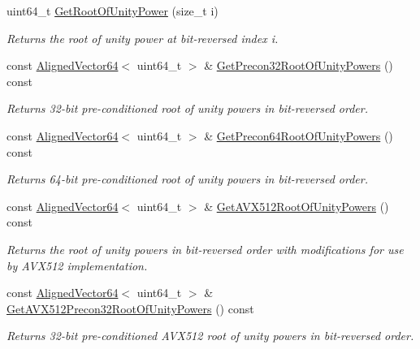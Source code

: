 \begin{DoxyCompactItemize}
uint64\+\_\+t \hyperlink{classintel_1_1hexl_1_1NTT_af0ab14a87e3f9e8cf46502c4c766fec5}{Get\+Root\+Of\+Unity\+Power} (size\+\_\+t i)
\begin{DoxyCompactList}\small\item\em Returns the root of unity power at bit-\/reversed index i. \end{DoxyCompactList}\item 
const \hyperlink{namespaceintel_1_1hexl_afbdf0d2cc4209ee547a88ff22a02801b}{Aligned\+Vector64}$<$ uint64\+\_\+t $>$ \& \hyperlink{classintel_1_1hexl_1_1NTT_a1cbd65fb426faafbd22fcb8b7ee98807}{Get\+Precon32\+Root\+Of\+Unity\+Powers} () const
\begin{DoxyCompactList}\small\item\em Returns 32-\/bit pre-\/conditioned root of unity powers in bit-\/reversed order. \end{DoxyCompactList}\item 
const \hyperlink{namespaceintel_1_1hexl_afbdf0d2cc4209ee547a88ff22a02801b}{Aligned\+Vector64}$<$ uint64\+\_\+t $>$ \& \hyperlink{classintel_1_1hexl_1_1NTT_a3bddde00a1832f4ac175e71469939e51}{Get\+Precon64\+Root\+Of\+Unity\+Powers} () const
\begin{DoxyCompactList}\small\item\em Returns 64-\/bit pre-\/conditioned root of unity powers in bit-\/reversed order. \end{DoxyCompactList}\item 
const \hyperlink{namespaceintel_1_1hexl_afbdf0d2cc4209ee547a88ff22a02801b}{Aligned\+Vector64}$<$ uint64\+\_\+t $>$ \& \hyperlink{classintel_1_1hexl_1_1NTT_ac93455767a667ef07aa41f747c77b4ae}{Get\+A\+V\+X512\+Root\+Of\+Unity\+Powers} () const
\begin{DoxyCompactList}\small\item\em Returns the root of unity powers in bit-\/reversed order with modifications for use by A\+V\+X512 implementation. \end{DoxyCompactList}\item 
const \hyperlink{namespaceintel_1_1hexl_afbdf0d2cc4209ee547a88ff22a02801b}{Aligned\+Vector64}$<$ uint64\+\_\+t $>$ \& \hyperlink{classintel_1_1hexl_1_1NTT_acf8896d7c5ab8c47fe860f3d5a1be215}{Get\+A\+V\+X512\+Precon32\+Root\+Of\+Unity\+Powers} () const
\begin{DoxyCompactList}\small\item\em Returns 32-\/bit pre-\/conditioned A\+V\+X512 root of unity powers in bit-\/reversed order. \end{DoxyCompactList}\item 

\end{DoxyCompactItemize}
